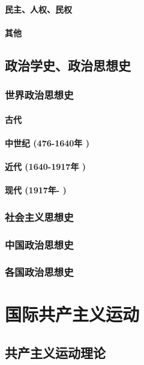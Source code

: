 \documentclass[UTF8]{../RepresentationUniverse}
\begin{document}
    \subsubsection{民主、人权、民权}
    \subsubsection{其他}


\section{政治学史、政治思想史}
    \subsection{世界政治思想史}
        \subsubsection{古代}
        \subsubsection{中世纪 (476-1640年 )}
        \subsubsection{近代 (1640-1917年 )}
        \subsubsection{现代 (1917年- )}
    \subsection{社会主义思想史}
    \subsection{中国政治思想史}
    \subsection{各国政治思想史}






\chapter{国际共产主义运动}
\section{共产主义运动理论}
\end{document}
